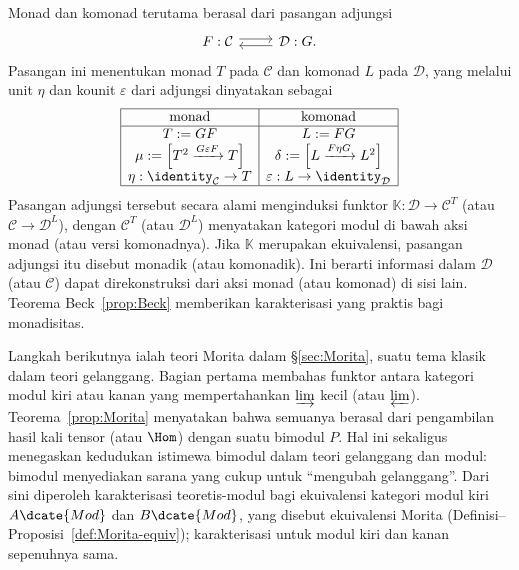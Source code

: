 Monad dan komonad terutama berasal dari pasangan adjungsi
\[\begin{tikzcd}
	F: \mathcal{C} \arrow[shift left, r] & \mathcal{D}: G \arrow[shift left, l].
\end{tikzcd}\]
Pasangan ini menentukan monad $T$ pada $\mathcal{C}$ dan komonad $L$ pada
$\mathcal{D}$, yang melalui unit $\eta$ dan kounit $\varepsilon$ dari adjungsi
dinyatakan sebagai
\[\begin{array}{|c|c|}\hline
	\text{monad} & \text{komonad} \\ \hline
	T := GF & L := FG \\
	\mu := \left[ T^2 \xrightarrow{G\varepsilon F} T \right] & \delta := \left[ L \xrightarrow{F\eta G} L^2 \right] \\
	\eta : \identity_{\mathcal{C}} \to T & \varepsilon: L \to \identity_{\mathcal{D}} \\ \hline 
\end{array}\]
Pasangan adjungsi tersebut secara alami menginduksi funktor
$\mathbb{K}:\mathcal{D}\to\mathcal{C}^T$ (atau
$\mathcal{C}\to\mathcal{D}^L$), dengan $\mathcal{C}^T$ (atau
$\mathcal{D}^L$) menyatakan kategori modul di bawah aksi monad (atau versi
komonadnya). Jika $\mathbb{K}$ merupakan ekuivalensi, pasangan adjungsi itu
disebut monadik (atau komonadik). Ini berarti informasi dalam $\mathcal{D}$
(atau $\mathcal{C}$) dapat direkonstruksi dari aksi monad (atau komonad) di sisi
lain. Teorema Beck~\ref{prop:Beck} memberikan karakterisasi yang praktis bagi
monadisitas.

Langkah berikutnya ialah teori Morita dalam \S\ref{sec:Morita}, suatu tema
klasik dalam teori gelanggang. Bagian pertama membahas funktor antara
kategori modul kiri atau kanan yang mempertahankan $\varinjlim$ kecil (atau
$\varprojlim$). Teorema~\ref{prop:Morita} menyatakan bahwa semuanya berasal
dari pengambilan hasil kali tensor (atau $\Hom$) dengan suatu bimodul $P$.
Hal ini sekaligus menegaskan kedudukan istimewa bimodul dalam teori gelanggang
dan modul: bimodul menyediakan sarana yang cukup untuk ``mengubah gelanggang''.
Dari sini diperoleh karakterisasi teoretis-modul bagi ekuivalensi kategori
modul kiri $A\dcate{Mod}$ dan $B\dcate{Mod}$, yang disebut ekuivalensi Morita
(Definisi--Proposisi~\ref{def:Morita-equiv}); karakterisasi untuk modul kiri
dan kanan sepenuhnya sama.

